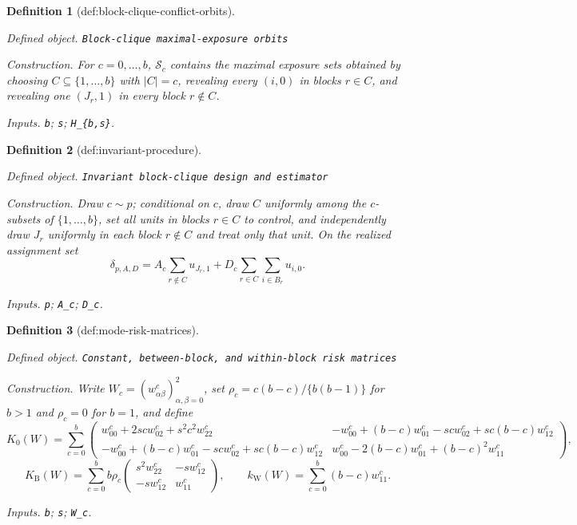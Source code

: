 \documentclass{article}
\newtheorem{definition}{Definition}
\begin{document}
\begin{definition}[def:block-clique-conflict-orbits]\label{def:block-clique-conflict-orbits}
\par\smallskip\noindent\emph{Defined object.} \texttt{Block-\allowbreak{}clique maximal-\allowbreak{}exposure orbits}
\par\smallskip\noindent\emph{Construction.} For \(c=0,\ldots,b\), \(\mathcal S_c\) contains the maximal exposure sets obtained by choosing \(C\subseteq\{1,\ldots,b\}\) with \(|C|=c\), revealing every \((i,0)\) in blocks \(r\in C\), and revealing one \((J_r,1)\) in every block \(r\notin C\).
\par\smallskip\noindent\emph{Inputs.} \texttt{b}; \texttt{s}; \texttt{H\_\allowbreak{}\{b,\allowbreak{}s\}\allowbreak{}}.
\end{definition}

\begin{definition}[def:invariant-procedure]\label{def:invariant-procedure}
\par\smallskip\noindent\emph{Defined object.} \texttt{Invariant block-\allowbreak{}clique design and estimator}
\par\smallskip\noindent\emph{Construction.} Draw \(c\sim p\); conditional on \(c\), draw \(C\) uniformly among the \(c\)-subsets of \(\{1,\ldots,b\}\), set all units in blocks \(r\in C\) to control, and independently draw \(J_r\) uniformly in each block \(r\notin C\) and treat only that unit. On the realized assignment set \[\delta_{p,A,D}=A_c\sum_{r\notin C}u_{J_r,1}+D_c\sum_{r\in C}\sum_{i\in B_r}u_{i,0}.\]
\par\smallskip\noindent\emph{Inputs.} \texttt{p}; \texttt{A\_\allowbreak{}c}; \texttt{D\_\allowbreak{}c}.
\end{definition}

\begin{definition}[def:mode-risk-matrices]\label{def:mode-risk-matrices}
\par\smallskip\noindent\emph{Defined object.} \texttt{Constant,\allowbreak{} between-\allowbreak{}block,\allowbreak{} and within-\allowbreak{}block risk matrices}
\par\smallskip\noindent\emph{Construction.} Write \(W_c=(w^c_{\alpha\beta})_{\alpha,\beta=0}^2\), set \(\rho_c=c(b-c)/\{b(b-1)\}\) for \(b>1\) and \(\rho_c=0\) for \(b=1\), and define \[K_0(W)=\sum_{c=0}^b\begin{pmatrix}w^c_{00}+2scw^c_{02}+s^2c^2w^c_{22}&-w^c_{00}+(b-c)w^c_{01}-scw^c_{02}+sc(b-c)w^c_{12}\\-w^c_{00}+(b-c)w^c_{01}-scw^c_{02}+sc(b-c)w^c_{12}&w^c_{00}-2(b-c)w^c_{01}+(b-c)^2w^c_{11}\end{pmatrix},\] \[K_{\mathrm B}(W)=\sum_{c=0}^b b\rho_c\begin{pmatrix}s^2w^c_{22}&-sw^c_{12}\\-sw^c_{12}&w^c_{11}\end{pmatrix},\qquad k_{\mathrm W}(W)=\sum_{c=0}^b(b-c)w^c_{11}.\]
\par\smallskip\noindent\emph{Inputs.} \texttt{b}; \texttt{s}; \texttt{W\_\allowbreak{}c}.
\end{definition}
\end{document}
